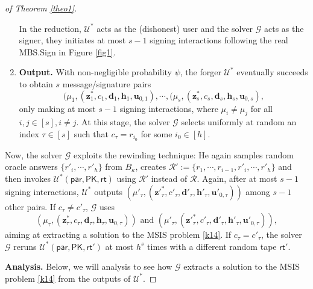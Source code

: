 \documentclass[conference]{IEEEtran}
\newtheorem{proof}{Proof}
\begin{document}
\begin{proof}[of Theorem \ref{theo1}]
\begin{enumerate}
			In the reduction, $\mathcal{U}^*$ acts as the (dishonest) user and  the solver $\mathcal{G}$ acts as the signer, they initiates at most $s-1$ signing interactions following the real \textsf{MBS.Sign} in Figure \ref{fig1}.
			
			\item 
			\textbf{Output.} With non-negligible probability $\psi$, the forger $\mathcal{U}^*$ eventually succeeds to obtain $s$ message/signature pairs $$(\mu_1, (\mathbf{z}^*_{1}, c_1, \mathbf{d}_1, \mathbf{h}_{1}, \mathbf{u}_{0,1}), \cdots, (\mu_s, (\mathbf{z}^*_{s}, c_s, \mathbf{d}_s, \mathbf{h}_{s}, \mathbf{u}_{0,s}),$$  only making at most $s-1$ signing interactions,  where $\mu_i \neq \mu_j$ for all $i,j\in[s], i\neq j$. At this stage, the solver $\mathcal{G}$ selects uniformly at random an index $\tau \in [s]$ such that $c_\tau=r_{i_0}$ for some $i_0 \in [h]$. 
			
			
		\end{enumerate}	
		
		
		Now, the solver $\mathcal{G}$ exploits the rewinding technique: He again samples random oracle answers $\{r'_{i}, \cdots, r'_{h}\}$ from $B_{\kappa}$, creates $\mathcal{R}':=\{r_1, \cdots, r_{i-1}, r'_{i}, \cdots, r'_{h} \}$ and then invokes $\mathcal{U}^*(\mathsf{par}, \textsf{PK}, \textsf{rt})$ using $\mathcal{R}'$ instead of $\mathcal{R}$. 
		Again, after at most $s-1$ signing interactions, $\mathcal{U}^*$ outputs
		$(\mu'_\tau, (\mathbf{z'}^*_{\tau}, c'_\tau, \mathbf{d}'_\tau, \mathbf{h}'_{\tau}, \mathbf{u}'_{0,\tau}))$ among $s-1$ other pairs. If $c_\tau \neq  c'_\tau$, 
		$\mathcal{G}$ uses 
		\begin{equation}\label{k15}
		(\mu_\tau, (\mathbf{z}^*_{\tau}, c_\tau, \mathbf{d}_\tau, \mathbf{h}_{\tau}, \mathbf{u}_{0,\tau})) \text{ and } (\mu'_\tau, (\mathbf{z'}^*_{\tau}, c'_\tau, \mathbf{d}'_\tau, \mathbf{h}'_{\tau}, \mathbf{u}'_{0,\tau})),
		\end{equation}
		aiming at extracting a solution to the \textsf{MSIS} problem \eqref{k14}. If $c_\tau =  c'_\tau$, the solver $\mathcal{G}$ reruns $\mathcal{U}^*(\mathsf{par}, \textsf{PK}, \textsf{rt}')$ at most $h^{s}$ times with a different random tape $\textsf{rt}'$.
		
		
		
		
		\textbf{Analysis.} 
		Below, we will analysis to see how $\mathcal{G}$ extracts a solution to the \textsf{MSIS} problem \eqref{k14} from the outputs of $\mathcal{U}^*$.
		

\end{proof}
\end{document}

